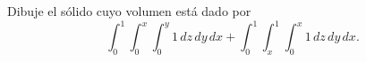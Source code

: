 Dibuje el sólido cuyo volumen está dado por
\[
\int_0^1\int_0^x\int_0^y1\,dz\,dy\,dx
+\int_0^1\int_x^1\int_0^x1\,dz\,dy\,dx.
\]
